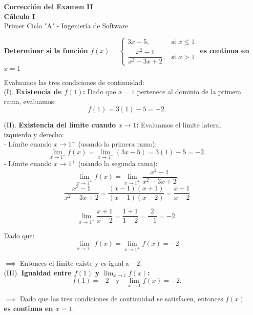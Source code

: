 \documentclass[answers]{exam}
\begin{document}
\begin{center}
	\Large\textbf{Corrección del Examen II}\\[1em]
	\large\textbf{Cálculo I}\\[1em]
	\large Primer Ciclo "A" - Ingeniería de Software\\[1em]
\end{center}


\begin{questions}

	\question \large\textbf{Determinar si la  función \(f(x) =
		\begin{cases}
			3x-5,                    & \text{si } x \le 1 \\[1em]
			\dfrac{x^2-1}{x^2-3x+2}, & \text{si } x > 1
		\end{cases}\) es continua en $x=1$}

	\vspace{0.5cm}

	Evaluamos las tres condiciones de continuidad:\\

	(I). \textbf{Existencia de \( f(1) \):  }
	Dado que \( x = 1 \) pertenece al dominio de la primera rama, evaluamos:
	\[
		f(1) = 3(1) - 5 = -2.
	\]

	(II). \textbf{Existencia del límite cuando \( x \to 1 \):  }
	Evaluamos el límite lateral izquierdo y derecho:\\

	- Límite cuando \( x \to 1^- \) (usando la primera rama):
	\[
		\lim_{x \to 1^-} f(x) = \lim_{x \to 1^-} (3x - 5) = 3(1) - 5 = -2.
	\]
	- Límite cuando \( x \to 1^+ \) (usando la segunda rama):
	\[
		\lim_{x \to 1^+} f(x) = \lim_{x \to 1^+} \dfrac{x^2 - 1}{x^2 - 3x + 2}.
	\]
	\[
		\dfrac{x^2 - 1}{x^2 - 3x + 2} =  \dfrac{(x - 1)(x + 1)}{(x - 1)(x - 2)}=  \dfrac{x + 1}{x - 2}
	\]

	\[
		\lim_{x \to 1^+} \dfrac{x + 1}{x - 2} = \dfrac{1 + 1}{1 - 2} = \dfrac{2}{-1} = -2.
	\]

	Dado que:
	\[ \lim_{x \to 1^-} f(x) = \lim_{x \to 1^+} f(x) = -2 \]

	$\implies$ Entonces el límite existe y es igual a \(-2\).\\

	(III). \textbf{Igualdad entre \( f(1) \) y \( \lim_{x \to 1} f(x) \):  }
	\[
		f(1) = -2 \quad \text{y} \quad \lim_{x \to 1} f(x) = -2.
	\]

	$\implies$ Dado que las tres condiciones de continuidad se satisfacen, entonces \textbf{\( f(x) \) es continua en \( x = 1 \)}.
	\newpage


\end{questions}
\end{document}
